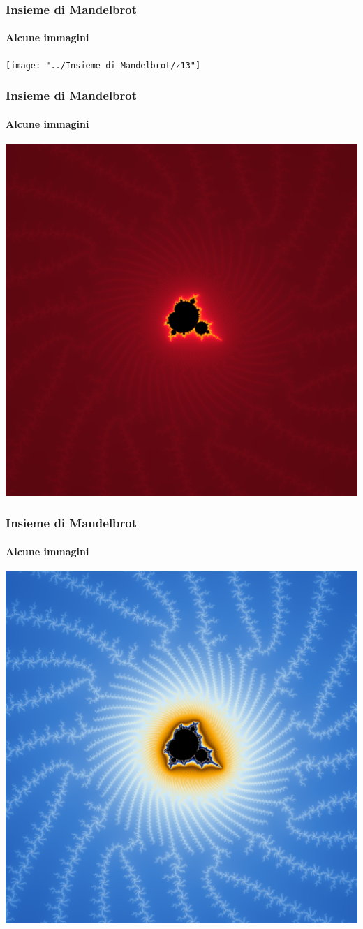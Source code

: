 \documentclass{beamer}
\begin{document}
			\begin{frame}
				\frametitle{Insieme di Mandelbrot}
				\framesubtitle{Alcune immagini}
				\begin{center}
					\texttt{[image: "../Insieme di Mandelbrot/z13"]}
				\end{center}
			\end{frame}
			\begin{frame}
				\frametitle{Insieme di Mandelbrot}
				\framesubtitle{Alcune immagini}
				\begin{center}
					\includegraphics[width=0.7\linewidth]{"../Insieme di Mandelbrot/z14"}
				\end{center}
			\end{frame}
			\begin{frame}
				\frametitle{Insieme di Mandelbrot}
				\framesubtitle{Alcune immagini}
				\begin{center}
					\includegraphics[width=0.7\linewidth]{"../Insieme di Mandelbrot/z15"}
				\end{center}
			\end{frame}
\end{document}
